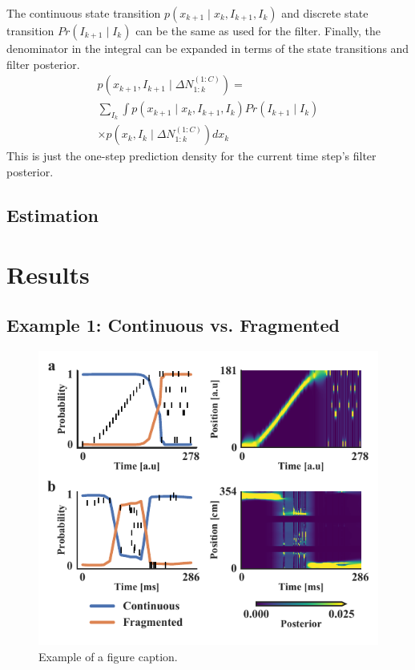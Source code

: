 \documentclass[conference]{IEEEtran}
\begin{document}
The continuous state transition $p(x_{k+1} \mid x_{k}, I_{k+1}, I_{k})$ and discrete state transition $Pr(I_{k+1} \mid I_{k})$ can be the same as used for the filter. Finally, the denominator in the integral can be expanded in terms of the state transitions and filter posterior.
\begin{multline}
p(x_{k+1}, I_{k+1} \mid \Delta N_{1:k}^{(1:C)}) = \\
\sum_{I_{k}} \int p(x_{k+1} \mid x_{k}, I_{k+1}, I_{k}) Pr(I_{k+1} \mid I_{k}) \\
\times p(x_{k}, I_{k} \mid \Delta N_{1:k}^{(1:C)}) dx_{k}
\end{multline}
This is just the one-step prediction density for the current time step's filter posterior.

\subsection{Estimation}
\section{Results}
\subsection{Example 1: Continuous vs. Fragmented}
\begin{figure}[ht]
\centerline{\includegraphics{fig1.pdf}}
\caption{Example of a figure caption.}
\label{fig1}
\end{figure}
\end{document}
